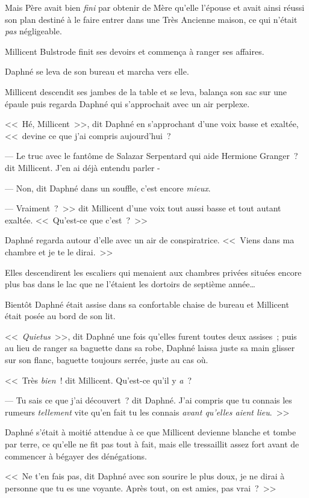 Mais Père avait bien \emph{fini} par obtenir de Mère qu'elle l'épouse et avait ainsi réussi son plan destiné à le faire entrer dans une Très Ancienne maison, ce qui n'était \emph{pas} négligeable.

Millicent Bulstrode finit ses devoirs et commença à ranger ses affaires.

Daphné se leva de son bureau et marcha vers elle.

Millicent descendit ses jambes de la table et se leva, balança son sac sur une épaule puis regarda Daphné qui s'approchait avec un air perplexe.

<<~Hé, Millicent~>>, dit Daphné en s'approchant d'une voix basse et exaltée, <<~devine ce que j'ai compris aujourd'hui~?

--- Le truc avec le fantôme de Salazar Serpentard qui aide Hermione Granger~? dit Millicent. J'en ai déjà entendu parler -

--- Non, dit Daphné dans un souffle, c'est encore \emph{mieux}.

--- Vraiment~?~>> dit Millicent d'une voix tout aussi basse et tout autant exaltée. <<~Qu'est-ce que c'est~?~>>

Daphné regarda autour d'elle avec un air de conspiratrice. <<~Viens dans ma chambre et je te le dirai.~>>

Elles descendirent les escaliers qui menaient aux chambres privées situées encore plus bas dans le lac que ne l'étaient les dortoirs de septième année…

Bientôt Daphné était assise dans sa confortable chaise de bureau et Millicent était posée au bord de son lit.

<<~\emph{Quietus}~>>, dit Daphné une fois qu'elles furent toutes deux assises~; puis au lieu de ranger sa baguette dans sa robe, Daphné laissa juste sa main glisser sur son flanc, baguette toujours serrée, juste au cas où.

<<~Très \emph{bien}~! dit Millicent. Qu'est-ce qu'il y \emph{a}~?

--- Tu sais ce que j'ai découvert~? dit Daphné. J'ai compris que tu connais les rumeurs \emph{tellement} vite qu'en fait tu les connais \emph{avant qu'elles aient lieu}.~>>

Daphné s'était à moitié attendue à ce que Millicent devienne blanche et tombe par terre, ce qu'elle ne fit pas tout à fait, mais elle tressaillit assez fort avant de commencer à bégayer des dénégations.

<<~Ne t'en fais pas, dit Daphné avec son sourire le plus doux, je ne dirai à personne que tu es une voyante. Après tout, on est amies, pas vrai~?~>>

